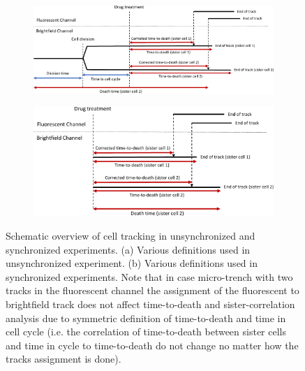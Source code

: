 \documentclass[pdftex,12pt,a4paper]{report}
\begin{document}
\begin{figure}[H]

\centering

\begin{subfigure}{\textwidth}
  \centering
  \includegraphics[width=\textwidth]{images/cell_death_def_unsyn.pdf}
  \caption{}
  \label{fig:cell_death_def_unsyn}
\end{subfigure}%

\begin{subfigure}{.75\textwidth}
  \centering
  \includegraphics[width=\textwidth]{images/cell_death_def_syn_2.pdf}
  \caption{}
  \label{fig:cell_death_def_syn_2}
\end{subfigure}%

\caption[Definition of terms in time-to-death analysis and sisters death time correlation analysis]{Schematic overview of cell tracking in unsynchronized and synchronized experiments. (a) Various definitions used in unsynchronized experiment. (b) Various definitions used in synchronized experiments. Note that in case micro-trench with two tracks in the fluorescent channel the assignment of the fluorescent to brightfield track does not affect time-to-death and sister-correlation analysis due to symmetric definition of time-to-death and time in cell cycle (i.e. the correlation of time-to-death between sister cells and time in cycle to time-to-death do not change no matter how the tracks assignment is done).}

\label{fig:cell_death_def}
\end{figure}
\end{document}
